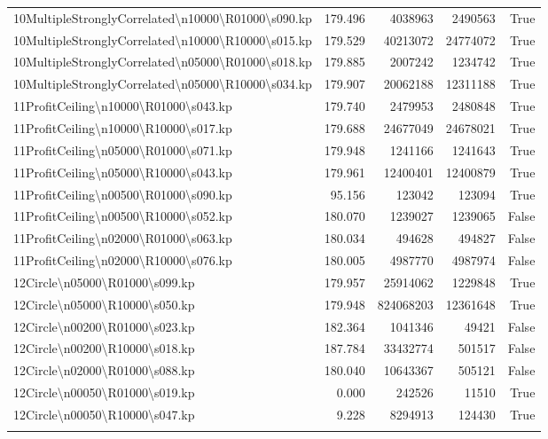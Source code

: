 \documentclass[english, a4paper,12pt]{article}
\begin{document}
\begin{tabularx}{0.95\textwidth}{|>{\raggedright\arraybackslash}Xrrrr|}
10MultipleStronglyCorrelated\textbackslash n10000\textbackslash R01000\textbackslash s090.kp & 179.496 & 4038963 & 2490563 & True \\
10MultipleStronglyCorrelated\textbackslash n10000\textbackslash R10000\textbackslash s015.kp & 179.529 & 40213072 & 24774072 & True \\
10MultipleStronglyCorrelated\textbackslash n05000\textbackslash R01000\textbackslash s018.kp & 179.885 & 2007242 & 1234742 & True \\
10MultipleStronglyCorrelated\textbackslash n05000\textbackslash R10000\textbackslash s034.kp & 179.907 & 20062188 & 12311188 & True \\
\hline
\addlinespace
\hline
11ProfitCeiling\textbackslash n10000\textbackslash R01000\textbackslash s043.kp & 179.740 & 2479953 & 2480848 & True \\
11ProfitCeiling\textbackslash n10000\textbackslash R10000\textbackslash s017.kp & 179.688 & 24677049 & 24678021 & True \\
11ProfitCeiling\textbackslash n05000\textbackslash R01000\textbackslash s071.kp & 179.948 & 1241166 & 1241643 & True \\
11ProfitCeiling\textbackslash n05000\textbackslash R10000\textbackslash s043.kp & 179.961 & 12400401 & 12400879 & True \\
11ProfitCeiling\textbackslash n00500\textbackslash R01000\textbackslash s090.kp & 95.156 & 123042 & 123094 & True \\
11ProfitCeiling\textbackslash n00500\textbackslash R10000\textbackslash s052.kp & 180.070 & 1239027 & 1239065 & False \\
11ProfitCeiling\textbackslash n02000\textbackslash R01000\textbackslash s063.kp & 180.034 & 494628 & 494827 & False \\
11ProfitCeiling\textbackslash n02000\textbackslash R10000\textbackslash s076.kp & 180.005 & 4987770 & 4987974 & False \\
\hline
\addlinespace
\hline
12Circle\textbackslash n05000\textbackslash R01000\textbackslash s099.kp & 179.957 & 25914062 & 1229848 & True \\
12Circle\textbackslash n05000\textbackslash R10000\textbackslash s050.kp & 179.948 & 824068203 & 12361648 & True \\
12Circle\textbackslash n00200\textbackslash R01000\textbackslash s023.kp & 182.364 & 1041346 & 49421 & False \\
12Circle\textbackslash n00200\textbackslash R10000\textbackslash s018.kp & 187.784 & 33432774 & 501517 & False \\
12Circle\textbackslash n02000\textbackslash R01000\textbackslash s088.kp & 180.040 & 10643367 & 505121 & False \\
12Circle\textbackslash n00050\textbackslash R01000\textbackslash s019.kp & 0.000 & 242526 & 11510 & True \\
12Circle\textbackslash n00050\textbackslash R10000\textbackslash s047.kp & 9.228 & 8294913 & 124430 & True \\
\hline
\addlinespace
\end{tabularx}
\end{document}
